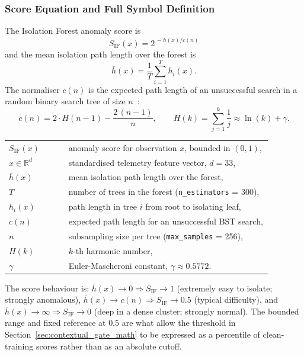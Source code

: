 \subsubsection{Score Equation and Full Symbol Definition}

The Isolation Forest anomaly score is
\begin{equation}
S_{\mathrm{IF}}(x) = 2^{\,-\bar{h}(x) / c(n)}
\label{eq:if_score}
\end{equation}
and the mean isolation path length over the forest is
\begin{equation}
\bar{h}(x) = \frac{1}{T} \sum_{i=1}^{T} h_i(x).
\label{eq:if_mean_path}
\end{equation}
The normaliser $c(n)$ is the expected path length of an unsuccessful search in a random binary search tree of size $n$~\cite{preiss1999data}:
\begin{equation}
c(n) = 2\cdot H(n-1) - \frac{2\,(n-1)}{n}, \qquad H(k) = \sum_{j=1}^{k} \frac{1}{j} \approx \ln(k) + \gamma.
\label{eq:c_of_n}
\end{equation}
\noindent\begin{tabular}{@{}p{0.20\linewidth}@{\quad}p{0.68\linewidth}@{}}
$S_{\mathrm{IF}}(x)$ & anomaly score for observation $x$, bounded in $(0, 1)$, \\
$x \in \mathbb{R}^{d}$ & standardised telemetry feature vector, $d = 33$, \\
$\bar{h}(x)$ & mean isolation path length over the forest, \\
$T$ & number of trees in the forest (\texttt{n\_estimators} = 300), \\
$h_i(x)$ & path length in tree $i$ from root to isolating leaf, \\
$c(n)$ & expected path length for an unsuccessful BST search, \\
$n$ & subsampling size per tree (\texttt{max\_samples} = 256), \\
$H(k)$ & $k$-th harmonic number, \\
$\gamma$ & Euler-Mascheroni constant, $\gamma \approx 0.5772$.
\end{tabular}

\vspace{0.5em}
The score behaviour is: $\bar{h}(x) \to 0 \Rightarrow S_{\mathrm{IF}} \to 1$ (extremely easy to isolate; strongly anomalous), $\bar{h}(x) \to c(n) \Rightarrow S_{\mathrm{IF}} \to 0.5$ (typical difficulty), and $\bar{h}(x) \to \infty \Rightarrow S_{\mathrm{IF}} \to 0$ (deep in a dense cluster; strongly normal). The bounded range and fixed reference at $0.5$ are what allow the threshold in Section~\ref{sec:contextual_gate_math} to be expressed as a percentile of clean-training scores rather than as an absolute cutoff.

